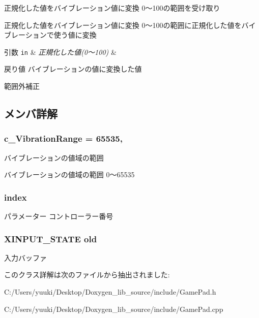 正規化した値をバイブレーション値に変換  0〜100の範囲を受け取り 

正規化した値をバイブレーション値に変換  0〜100の範囲に正規化した値をバイブレーションで使う値に変換


\begin{DoxyParams}[1]{引数}
\mbox{\tt in}  & {\em 正規化した値(0〜100)} & \\
\hline
\end{DoxyParams}
\begin{DoxyReturn}{戻り値}
バイブレーションの値に変換した値 
\end{DoxyReturn}
範囲外補正 

\subsection{メンバ詳解}
\subsubsection[{\texorpdfstring{c\+\_\+\+Vibration\+Range}{c_VibrationRange}}]{\setlength{\rightskip}{0pt plus 5cm}c\+\_\+\+Vibration\+Range = 65535\hspace{0.3cm}{\ttfamily [static]}, {\ttfamily [private]}}\hypertarget{class_game_pad_a59b74191541375522620e4f02263413b}{}\label{class_game_pad_a59b74191541375522620e4f02263413b}


バイブレーションの値域の範囲 

バイブレーションの値域の範囲 0〜65535 
\subsubsection[{\texorpdfstring{index}{index}}]{ index\hspace{0.3cm}{\ttfamily [private]}}\hypertarget{class_game_pad_a7875de9269063a44a5480b1c0c530a84}{}\label{class_game_pad_a7875de9269063a44a5480b1c0c530a84}
パラメーター コントローラー番号 
\subsubsection[{\texorpdfstring{old}{old}}]{\setlength{\rightskip}{0pt plus 5cm}X\+I\+N\+P\+U\+T\+\_\+\+S\+T\+A\+TE old\hspace{0.3cm}{\ttfamily [private]}}\hypertarget{class_game_pad_af4b6c92b30887bee9ccde17759716c51}{}\label{class_game_pad_af4b6c92b30887bee9ccde17759716c51}
入力バッファ 

このクラス詳解は次のファイルから抽出されました\+:\begin{DoxyCompactItemize}
\item 
C\+:/\+Users/yuuki/\+Desktop/\+Doxygen\+\_\+lib\+\_\+source/include/Game\+Pad.\+h\item 
C\+:/\+Users/yuuki/\+Desktop/\+Doxygen\+\_\+lib\+\_\+source/include/Game\+Pad.\+cpp\end{DoxyCompactItemize}
